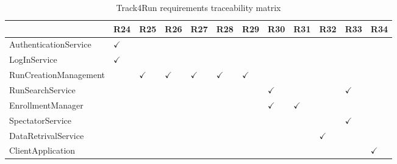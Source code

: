 \begin{table}
\begin{adjustwidth}{-4cm}{}
\captionsetup{justification=centering}
\caption{Track4Run requirements traceability matrix}
  \label{tab:table3}
\begin{tabular}{|l||l|l|l|l|l|l|l|l|l|l|l|}
\hline
\cellcolor[HTML]{EFEFEF}                      & \cellcolor[HTML]{EFEFEF} R24 & \cellcolor[HTML]{EFEFEF} R25 & \cellcolor[HTML]{EFEFEF} R26 & \cellcolor[HTML]{EFEFEF} R27 & \cellcolor[HTML]{EFEFEF} R28 & \cellcolor[HTML]{EFEFEF} R29 & \cellcolor[HTML]{EFEFEF} R30 & \cellcolor[HTML]{EFEFEF} R31 & \cellcolor[HTML]{EFEFEF} R32 & \cellcolor[HTML]{EFEFEF} R33 & \cellcolor[HTML]{EFEFEF} R34\\ \hline \hline
\cellcolor[HTML]{EFEFEF} AuthenticationService & $\checkmark$  &   &  &    &   &   &   &    &   &   &   \\ \hline
\cellcolor[HTML]{EFEFEF}LogInService     &  $\checkmark$  &    &    &   &    &    &    &    &   &   &  \\ \hline
\cellcolor[HTML]{EFEFEF}RunCreationManagement         &    & $\checkmark$   &  $\checkmark$  &  $\checkmark$  & $\checkmark$  &  $\checkmark$  &    &    &   &   & \\ \hline
\cellcolor[HTML]{EFEFEF} RunSearchService    &    &    &    &    &    &    &  $\checkmark$ &   &  & $\checkmark$ & \\ \hline
\cellcolor[HTML]{EFEFEF} EnrollmentManager  &    &    &    &    &    &    & $\checkmark$   &  $\checkmark$  &   &   & \\ \hline
\cellcolor[HTML]{EFEFEF} SpectatorService  &    &    &    &    &   &    &    &    &   &  $\checkmark$ & \\ \hline
\cellcolor[HTML]{EFEFEF} DataRetrivalService  &    &    &    &    &    &    &    &    &  $\checkmark$   &   &  \\ \hline
\cellcolor[HTML]{EFEFEF} ClientApplication  &    &    &    &    &    &    &    &    &     &   & $\checkmark$ \\ \hline
\end{tabular}
\end{adjustwidth}
\end{table}